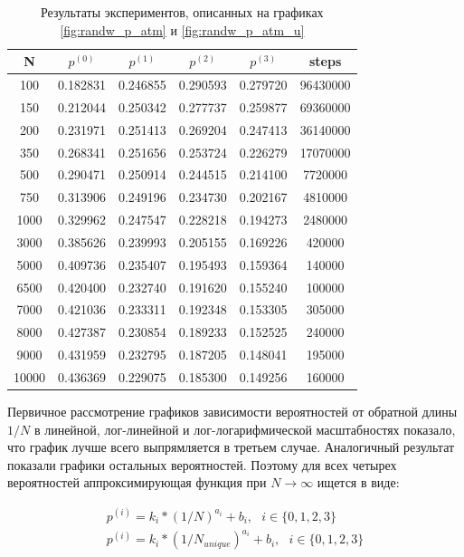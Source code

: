 \begin{table}[h] 
\centering
\begin{tabular}{|c|c|c|c|c|c|}
\hline
N & $p^{(0)}$ & $p^{(1)}$ & $p^{(2)}$ & $p^{(3)}$ & steps \\ \hline
100 & 0.182831 & 0.246855 & 0.290593 & 0.279720 & 96430000 \\ \hline 
150 & 0.212044 & 0.250342 &	0.277737 &	0.259877 &	69360000 \\  \hline
200 & 0.231971 & 0.251413 & 0.269204 & 0.247413 & 36140000 \\ \hline
350 & 0.268341 &0.251656 &	0.253724 &	0.226279 &	17070000 \\ \hline
500 & 0.290471 & 0.250914 & 0.244515 & 0.214100 & 7720000 \\ \hline
750 & 0.313906 &0.249196 &	0.234730 &	0.202167 	&4810000 \\ \hline
1000 & 0.329962& 0.247547 & 0.228218 & 0.194273 & 2480000 \\ \hline
3000 & 0.385626&0.239993&0.205155	&0.169226 	&420000 \\ \hline
5000 & 0.409736& 0.235407 & 0.195493 & 0.159364 & 140000 \\ \hline
6500 & 0.420400&0.232740&0.191620	&0.155240 	&100000 \\ \hline
7000 & 0.421036&0.233311&0.192348 &	0.153305 &	305000 \\ \hline
8000 & 0.427387&0.230854 &	0.189233 &	0.152525 &	240000 \\ \hline
9000 & 0.431959&0.232795 &	0.187205 &	0.148041 &195000 \\ \hline
10000&0.436369&0.229075&0.185300&0.149256&160000  \\ \hline
\end{tabular}
\caption{Результаты экспериментов, описанных на графиках \ref{fig:randw_p_atm} и \ref{fig:randw_p_atm_u} }
\label{tab:randw_p_atm}
\end{table}

Первичное рассмотрение графиков зависимости вероятностей от обратной длины $1/N$ в линейной, лог-линейной и лог-логарифмической масштабностях показало, что график лучше всего выпрямляется в третьем случае. 
Аналогичный результат показали графики остальных вероятностей.
Поэтому для всех четырех вероятностей аппроксимирующая функция при $N \to \infty$ ищется в виде:

\begin{equation}
\begin{array}{l}
p^{(i)} = k_i * (1/N)^{a_i} + b_i, \ \ \ i \in \{ 0,1,2,3\} \\
p^{(i)} = k_i * (1/N_{unique})^{a_i} + b_i, \ \ \ i \in \{ 0,1,2,3\}
\end{array}
\end{equation}

